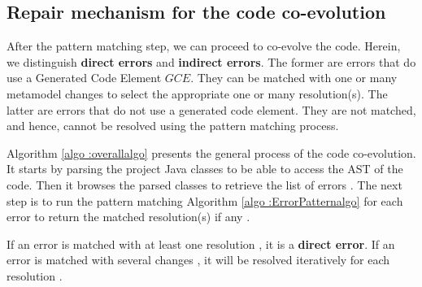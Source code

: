 \subsection{Repair mechanism for the code co-evolution}

\label{repairmechanism}


After the pattern matching step, we can proceed to co-evolve the code. 
Herein, we distinguish \textbf{direct errors} and \textbf{indirect errors}. The former are errors that do use a Generated Code Element $GCE$. They can be matched with one or many metamodel changes to select the appropriate one or many resolution(s). 
The latter are errors that %
do not use a generated code element. They are not matched, and hence, cannot be resolved using the pattern matching process. %



Algorithm \ref{algo :overallalgo} presents the general process of the code co-evolution. It starts by parsing the project Java classes {\small{}} to be able to access the AST of the code. Then it browses the parsed classes to retrieve the list of errors {\small{}}. 
The next step is to run the pattern matching Algorithm \ref{algo :ErrorPatternalgo} for each error to return the matched resolution(s) if any {\small{}}. 



%
%
%
If an error is matched with at least one resolution {\small{}}, it is a \textbf{direct error}. If an error is matched with several changes {\small{}}, it will be resolved iteratively for each resolution {\small{}}. 

